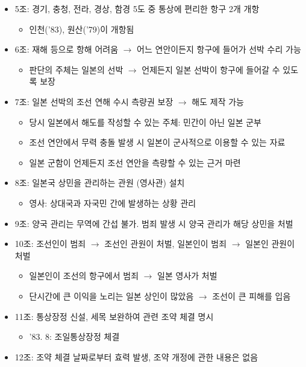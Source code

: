 \begin{itemize}
\begin{itemize}
    \end{itemize}
    \pagebreak
    \item 5조: 경기, 충청, 전라, 경상, 함경 5도 중 통상에 편리한 항구 2개 개항
    \begin{itemize}
        \item 인천('83), 원산('79)이 개항됨
    \end{itemize}
    \item 6조: 재해 등으로 항해 어려움 $\rightarrow$ 어느 연안이든지 항구에 들어가 선박 수리 가능
    \begin{itemize}
        \item 판단의 주체는 일본의 선박 $\rightarrow$ 언제든지 일본 선박이 항구에 들어갈 수 있도록 보장
    \end{itemize}
    \item 7조: 일본 선박의 조선 연해 수시 측량권 보장 $\rightarrow$ 해도 제작 가능
    \begin{itemize}
        \item 당시 일본에서 해도를 작성할 수 있는 주체: 민간이 아닌 일본 군부
        \item 조선 연안에서 무력 충돌 발생 시 일본이 군사적으로 이용할 수 있는 자료
        \item 일본 군함이 언제든지 조선 연안을 측량할 수 있는 근거 마련
    \end{itemize}
    \item 8조: 일본국 상민을 관리하는 관원 (영사관) 설치
    \begin{itemize}
        \item 영사: 상대국과 자국민 간에 발생하는 상황 관리
    \end{itemize}
    \item 9조: 양국 관리는 무역에 간섭 불가. 범죄 발생 시 양국 관리가 해당 상민을 처벌
    \item 10조: 조선인이 범죄 $\rightarrow$ 조선인 관원이 처벌, 일본인이 범죄 $\rightarrow$ 일본인 관원이 처벌
    \begin{itemize}
        \item 일본인이 조선의 항구에서 범죄 $\rightarrow$ 일본 영사가 처벌
        \item 단시간에 큰 이익을 노리는 일본 상인이 많았음 $\rightarrow$ 조선이 큰 피해를 입음
    \end{itemize}
    \item 11조: 통상장정 신설, 세목 보완하여 관련 조약 체결 명시
    \begin{itemize}
        \item '83. 8: 조일통상장정 체결
    \end{itemize}
    \item 12조: 조약 체결 날짜로부터 효력 발생, 조약 개정에 관한 내용은 없음
\end{itemize}

